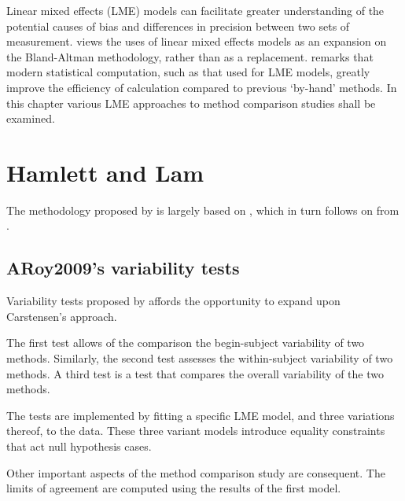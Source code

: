 \documentclass[12pt, a4paper]{report}
\theoremstyle{plain}
\theoremstyle{definition}
\theoremstyle{remark}
\begin{document}
	Linear mixed effects (LME) models can facilitate greater understanding of the potential causes of bias and differences in
	precision between two sets of measurement. \citet{LaiShiao} views the uses of linear mixed effects models as an expansion on the
	Bland-Altman methodology, rather than as a replacement.
	\citet{BXC2008} remarks that modern statistical computation, such as that used for LME models, greatly improve the efficiency of
	calculation compared to previous `by-hand' methods. In this chapter various LME approaches to method comparison studies shall
	be examined.
	
	\newpage
	
	
	\section{Hamlett and Lam}
	The methodology proposed by \citet{AARoy20092009} is largely based on \citet{hamlett}, which in turn follows on from \citet{lam}.
	
	
	
	
	
	\subsection{ARoy2009's variability tests}
	Variability tests proposed by \citet{AARoy20092009} affords the opportunity to expand upon Carstensen's approach.
	
	The first test allows of the comparison the begin-subject variability of two methods. Similarly, the second test
	assesses the within-subject variability of two methods. A third test is a test that compares the overall variability of the two methods.
	
	The tests are implemented by fitting a specific LME model, and three variations thereof, to the data. These three variant models introduce equality constraints that act null hypothesis cases.
	
	Other important aspects of the method comparison study are consequent. The limits of agreement are computed using the results of the first model.
	
	
\end{document}
